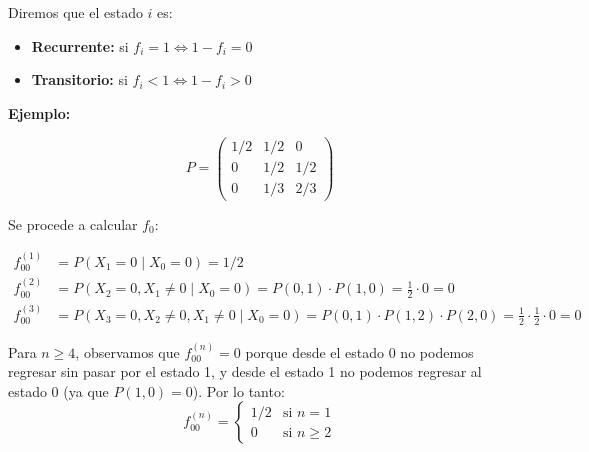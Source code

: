 \documentclass[12pt,a4paper]{article}
\begin{document}
Diremos que el estado $i$ es:

\begin{itemize}
    \item \textbf{Recurrente:} si $f_i = 1 \iff 1 - f_i = 0$
    \item \textbf{Transitorio:} si $f_i < 1 \iff 1 - f_i > 0$
\end{itemize}

\textbf{Ejemplo:}

\begin{equation*}
P = \begin{pmatrix}
1/2 & 1/2 & 0 \\
0 & 1/2 & 1/2 \\
0 & 1/3 & 2/3
\end{pmatrix}
\end{equation*}

\begin{center}
\end{center}

Se procede a calcular $f_0$:

\begin{align*}
f_{00}^{(1)} &= P(X_1=0 \mid X_0=0) = 1/2 \\
f_{00}^{(2)} &= P(X_2=0, X_1 \neq 0 \mid X_0=0) = P(0,1) \cdot P(1,0) = \frac{1}{2} \cdot 0 = 0 \\
f_{00}^{(3)} &= P(X_3=0, X_2 \neq 0, X_1 \neq 0 \mid X_0=0) = P(0,1) \cdot P(1,2) \cdot P(2,0) = \frac{1}{2} \cdot \frac{1}{2} \cdot 0 = 0
\end{align*}

Para $n \geq 4$, observamos que $f_{00}^{(n)} = 0$ porque desde el estado 0 no podemos regresar sin pasar por el estado 1, y desde el estado 1 no podemos regresar al estado 0 (ya que $P(1,0) = 0$). Por lo tanto:
\begin{equation*}
f_{00}^{(n)} = \begin{cases}
1/2 & \text{si } n = 1 \\
0 & \text{si } n \geq 2
\end{cases}
\end{equation*}
\end{document}
